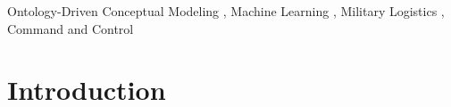 \documentclass[
]{ceurart}
\begin{document}
\begin{keywords}
  Ontology-Driven Conceptual Modeling \sep
  Machine Learning \sep
  Military Logistics \sep
  Command and Control
\end{keywords}

\maketitle

\section{Introduction}
\end{document}
